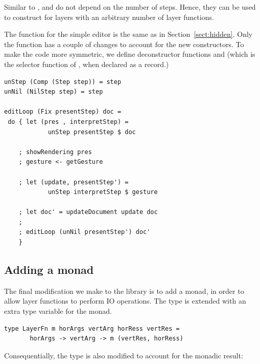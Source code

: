 \documentclass[preprint,natbib]{sigplanconf}
\begin{document}
Similar to ,  and  do not depend on the number of steps. Hence, they can be used to construct  for layers with an arbitrary number of layer functions.



The  function for the simple editor is the same as in Section~\ref{sect:hidden}. Only the  function has a couple of changes to account for the new constructors. To make the code more symmetric, we define deconstructor functions  and  (which is the selector function of , when declared as a record.)

\begin{small}
\begin{verbatim}
unStep (Comp (Step step)) = step
unNil (NilStep step) = step

editLoop (Fix presentStep) doc = 
 do { let (pres , interpretStep) = 
            unStep presentStep $ doc
    
    ; showRendering pres
    ; gesture <- getGesture
    
    ; let (update, presentStep') =
            unStep interpretStep $ gesture
    
    ; let doc' = updateDocument update doc
    ; 
    ; editLoop (unNil presentStep') doc'
    }
\end{verbatim}%
\end{small}



%																
\subsection{Adding a monad}


The final modification we make to the library is to add a monad, in order to allow layer functions to perform IO operations. The type  is extended with an extra type variable  for the monad.

\begin{small}
\begin{verbatim}
type LayerFn m horArgs vertArg horRess vertRes =
       horArgs -> vertArg -> m (vertRes, horRess)
\end{verbatim}
\end{small}

Consequentially, the  type is also modified to account for the monadic result:
\end{document}
